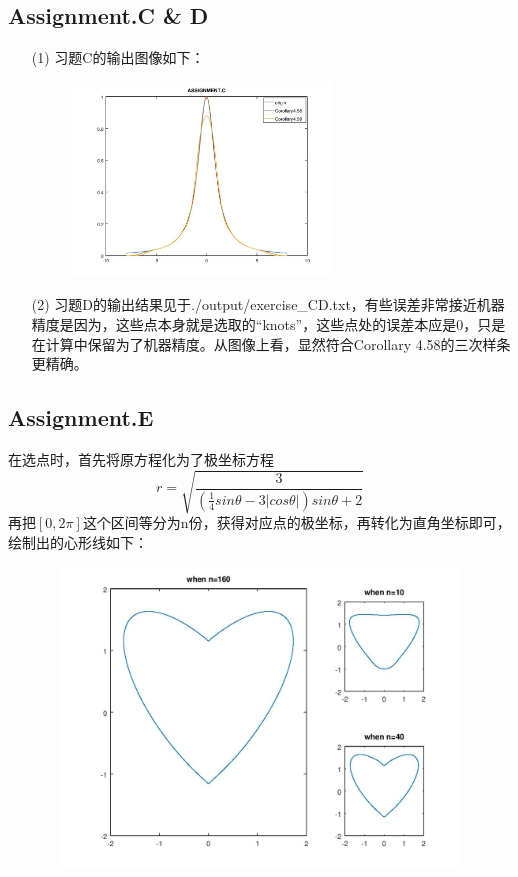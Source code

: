 \documentclass[a4paper,11.5pt,UTF8]{ctexart}
\begin{document}
\begin{large}
\subsection{Assignment.C \& D}
\begin{itemize}
	\item[(1)] 习题C的输出图像如下：
	\begin{figure}[H]
		\centering
		\includegraphics[width=0.65\textwidth]{../plot/figure/figure_C.jpg}
	\end{figure}
	\item[(2)] 习题D的输出结果见于./output/exercise\_CD.txt，有些误差非常接近机器精度是因为，这些点本身就是选取的“knots”，这些点处的误差本应是0，只是在计算中保留为了机器精度。从图像上看，显然符合Corollary 4.58的三次样条更精确。
\end{itemize}

\subsection{Assignment.E}
\par 在选点时，首先将原方程化为了极坐标方程
$$r = \sqrt{\frac{3}{(\frac{1}{4}sin\theta-3|cos\theta|)sin\theta+2}}$$
再把$[0,2\pi]$这个区间等分为n份，获得对应点的极坐标，再转化为直角坐标即可，绘制出的心形线如下：
\begin{figure}[H]
	\centering
	\includegraphics[width=14cm,height=8cm]{../plot/figure/figure_E.jpg}
\end{figure}


\end{large}
\end{document}
